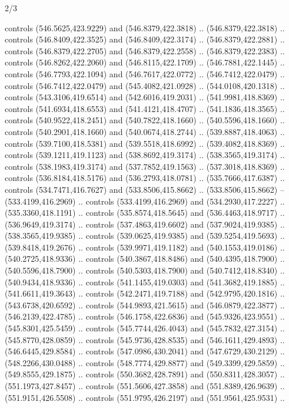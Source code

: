 \begin{flagdescription}{2/3}
\begin{scope}[xshift=0.5\flaglength,yshift=0.5\flagwidth,scale=\flagwidth/495.65]
\begin{scope}[y=0.8pt, x=0.8pt, yscale=-1,shift={(-463.76,-309.78)}]
  controls (546.5625,423.9229) and (546.8379,422.3818) .. (546.8379,422.3818) ..
  controls (546.8409,422.3525) and (546.8409,422.3174) .. (546.8379,422.2881) ..
  controls (546.8379,422.2705) and (546.8379,422.2558) .. (546.8379,422.2383) ..
  controls (546.8262,422.2060) and (546.8115,422.1709) .. (546.7881,422.1445) ..
  controls (546.7793,422.1094) and (546.7617,422.0772) .. (546.7412,422.0479) ..
  controls (546.7412,422.0479) and (545.4082,421.0928) .. (544.0108,420.1318) ..
  controls (543.3106,419.6514) and (542.6016,419.2031) .. (541.9981,418.8369) ..
  controls (541.6934,418.6553) and (541.4121,418.4707) .. (541.1836,418.3565) ..
  controls (540.9522,418.2451) and (540.7822,418.1660) .. (540.5596,418.1660) ..
  controls (540.2901,418.1660) and (540.0674,418.2744) .. (539.8887,418.4063) ..
  controls (539.7100,418.5381) and (539.5518,418.6992) .. (539.4082,418.8369) ..
  controls (539.1211,419.1123) and (538.8692,419.3174) .. (538.3565,419.3174) ..
  controls (538.1983,419.3174) and (537.7852,419.1563) .. (537.3018,418.8369) ..
  controls (536.8184,418.5176) and (536.2793,418.0781) .. (535.7666,417.6387) ..
  controls (534.7471,416.7627) and (533.8506,415.8662) .. (533.8506,415.8662) --
  (533.4199,416.2969) .. controls (533.4199,416.2969) and (534.2930,417.2227) ..
  (535.3360,418.1191) .. controls (535.8574,418.5645) and (536.4463,418.9717) ..
  (536.9649,419.3174) .. controls (537.4863,419.6602) and (537.9024,419.9385) ..
  (538.3565,419.9385) .. controls (539.0625,419.9385) and (539.5254,419.5693) ..
  (539.8418,419.2676) .. controls (539.9971,419.1182) and (540.1553,419.0186) ..
  (540.2725,418.9336) .. controls (540.3867,418.8486) and (540.4395,418.7900) ..
  (540.5596,418.7900) .. controls (540.5303,418.7900) and (540.7412,418.8340) ..
  (540.9434,418.9336) .. controls (541.1455,419.0303) and (541.3682,419.1885) ..
  (541.6611,419.3643) .. controls (542.2471,419.7188) and (542.9795,420.1816) ..
  (543.6738,420.6592) .. controls (544.9893,421.5615) and (546.0879,422.3877) ..
  (546.2139,422.4785) .. controls (546.1758,422.6836) and (545.9326,423.9551) ..
  (545.8301,425.5459) .. controls (545.7744,426.4043) and (545.7832,427.3154) ..
  (545.8770,428.0859) .. controls (545.9736,428.8535) and (546.1611,429.4893) ..
  (546.6445,429.8584) .. controls (547.0986,430.2041) and (547.6729,430.2129) ..
  (548.2266,430.0488) .. controls (548.7774,429.8877) and (549.3399,429.5859) ..
  (549.8555,429.1875) .. controls (550.3682,428.7891) and (550.8311,428.3057) ..
  (551.1973,427.8457) .. controls (551.5606,427.3858) and (551.8389,426.9639) ..
  (551.9151,426.5508) .. controls (551.9795,426.2197) and (551.9561,425.9531) ..

\end{scope}
\end{scope}
\end{flagdescription}
